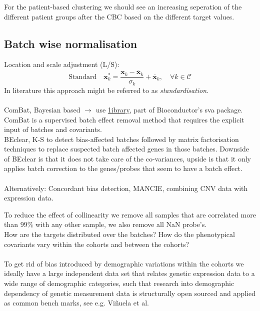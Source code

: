 \documentclass[a4paper,10pt]{article}
\begin{document}
For the patient-based clustering we should see an increasing seperation of the different patient groups after the CBC based on the different target values.



\subsection{Batch wise normalisation}
%
Location and scale adjustment (L/S):
\begin{equation}
\mbox{Standard}\quad \mathbf{x}^*_k= \frac{\mathbf{x}_k-\overline{\mathbf{x}}_k}{\sigma_k} + \overline{\mathbf{x}}_k,\quad \forall k\in \mathcal{C}
\end{equation}
%
In literature this approach might be referred to as \textit{standardisation}. \\ \\
%
ComBat, Bayesian based $\rightarrow$ use \href{http://www.bu.edu/jlab/wp-assets/ComBat/Abstract.html}{1ibrary}, part of Bioconductor's sva package. ComBat is a supervised batch effect removal method that requires the explicit input of batches and covariants.\\
%
BEclear, K-S to detect bias-affected batches followed by matrix factorisation techniques to replace suspected batch affected genes in those batches. Downside of BEclear is that it does not take care of the co-variances, upside is that
it only applies batch correction to the genes/probes that seem to have a batch effect. \\ \\ 

Alternatively: Concordant bias detection, MANCIE, combining CNV data with expression data.


To reduce the effect of collinearity we remove all samples that are correlated more than $99\%$ with 
any other sample, we also remove all NaN probe's. \\ 

%
How are the targets distributed over the batches? How do the phenotypical covariants vary within the 
cohorts and between the cohorts? \\ \\
%
To get rid of bias introduced by demographic variations within the cohorts we ideally have a large
independent data set that relates genetic expression data to a wide range of demographic categories, such that research into
demographic dependency of genetic measurement data is structurally open sourced and applied as common bench marks, see e.g. 
Vi\~{n}uela et al\cite{Vinuela2018}.
%
\end{document}
